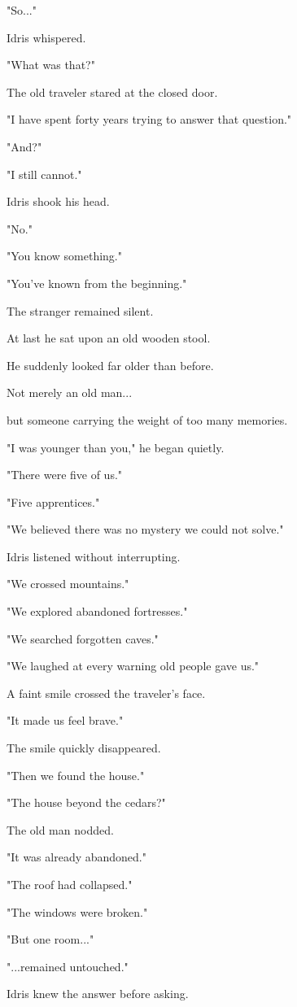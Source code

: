 \documentclass[12pt,openany]{book}
\begin{document}
"So..."

Idris whispered.

"What was that?"

The old traveler stared at the closed door.

"I have spent forty years trying to answer that question."

"And?"

"I still cannot."

Idris shook his head.

"No."

"You know something."

"You've known from the beginning."

The stranger remained silent.

At last he sat upon an old wooden stool.

He suddenly looked far older than before.

Not merely an old man...

but someone carrying the weight of too many memories.

"I was younger than you," he began quietly.

"There were five of us."

"Five apprentices."

"We believed there was no mystery we could not solve."

Idris listened without interrupting.

"We crossed mountains."

"We explored abandoned fortresses."

"We searched forgotten caves."

"We laughed at every warning old people gave us."

A faint smile crossed the traveler's face.

"It made us feel brave."

The smile quickly disappeared.

"Then we found the house."

"The house beyond the cedars?"

The old man nodded.

"It was already abandoned."

"The roof had collapsed."

"The windows were broken."

"But one room..."

"...remained untouched."

Idris knew the answer before asking.
\end{document}
